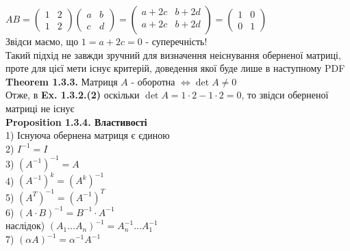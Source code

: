 \documentclass[a4paper, 14pt]{extarticle}
\def\prp#1{\textbf{Proposition {#1}}}
\def\th#1{\textbf{Theorem {#1}}}
\def\bigline{\vspace{5mm}\\}
\begin{document}
	$AB = \begin{pmatrix}
	1 & 2 \\
	1 & 2
	\end{pmatrix} \begin{pmatrix}
	a & b \\
	c & d
	\end{pmatrix} = \begin{pmatrix}
	a + 2c & b + 2d \\
	a + 2c & b + 2d \\
	\end{pmatrix} = \begin{pmatrix}
	1 & 0 \\
	0 & 1
	\end{pmatrix}$\\
	Звідси маємо, що $1 = a + 2c = 0$ - суперечність!\\
	Такий підхід не завжди зручний для визначення неіснування оберненої матриці, проте для цієї мети існує критерій, доведення якої буде лише в наступному PDF
	\bigline
	\th{1.3.3.} Матриця $A$ - оборотна $\iff \det A \neq 0$
	\bigline
	Отже, в \textbf{Ex. 1.3.2.(2)} оскільки $\det A = 1 \cdot 2 - 1 \cdot 2 = 0$, то звідси оберненої матриці не існує
	\bigline
	\prp{1.3.4. Властивості}\\
	1) Існуюча обернена матриця є єдиною\\
	2) $I^{-1} = I$\\
	3) $(A^{-1})^{-1} = A$\\
	4) $(A^{-1})^k = (A^k)^{-1}$\\
	5) $(A^T)^{-1} = (A^{-1})^T$\\
	6) $(A \cdot B)^{-1} = B^{-1} \cdot A^{-1}$\\
	наслідок) $(A_1 \dots A_n)^{-1} = A_n^{-1} \dots A_1^{-1}$\\
	7) $(\alpha A)^{-1} = \alpha^{-1} A^{-1}$\\
\end{document}
